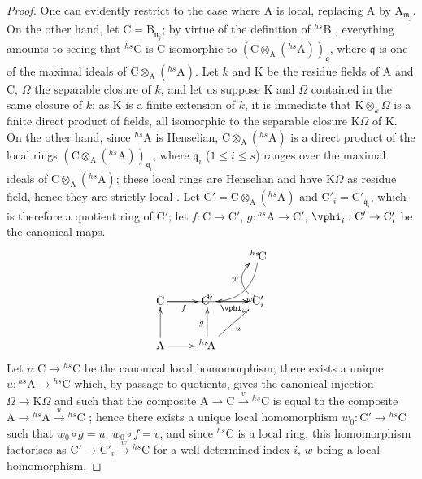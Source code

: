 \begin{proof}
One can evidently restrict to the case where A is local, replacing A by $\mathrm{A}_{\mathfrak{m}_j}$.
On the other hand, let $\mathrm{C}=\mathrm{B}_{\mathfrak{n}_j}$;
by virtue of the definition of ${}^{hs}\!\mathrm{B}$ , everything amounts to seeing that ${}^{hs}\!\mathrm{C}$ is C-isomorphic to $(\mathrm{C}\otimes_{\mathrm{A}}({}^{hs}\!\mathrm{A}))_{\mathfrak{q}}$, where $\mathfrak{q}$ is one of the maximal ideals of $\mathrm{C}\otimes_{\mathrm{A}}({}^{hs}\!\mathrm{A})$.
Let $k$ and K be the residue fields of A and C, $\Omega$ the separable closure of $k$, and let us suppose K and $\Omega$ contained in the same closure of $k$;
as K is a finite extension of $k$, it is immediate that $\mathrm{K}\otimes_k\Omega$ is a finite direct product of fields, all isomorphic to the separable closure $\mathrm{K}\Omega$ of K.
On the other hand, since ${}^{hs}\!\mathrm{A}$ is Henselian, $\mathrm{C}\otimes_{\mathrm{A}}({}^{hs}\!\mathrm{A})$ is a direct product of the local rings $(\mathrm{C}\otimes_{\mathrm{A}}({}^{hs}\!\mathrm{A}))_{\mathfrak{q}_i}$, where $\mathfrak{q}_i$ ($1\leq i\leq s$) ranges over the maximal ideals of $\mathrm{C}\otimes_{\mathrm{A}}({}^{hs}\!\mathrm{A})$; these local rings are Henselian  and have $\mathrm{K}\Omega$ as residue field, hence they are strictly local .
Let $\mathrm{C}'=\mathrm{C}\otimes_{\mathrm{A}}({}^{hs}\!\mathrm{A})$ and $\mathrm{C}'_i=\mathrm{C}'_{\mathfrak{q}_i}$, which is therefore a quotient ring of $\mathrm{C}'$;
let $f:\mathrm{C}\to\mathrm{C}'$, $g:{}^{hs}\!\mathrm{A}\to\mathrm{C}'$, $\vphi_i:\mathrm{C}'\to\mathrm{C}'_i$ be the canonical maps.
\[
  \xymatrix{
    && {}^{hs}\!\mathrm{C} \ar@/^1.2pc/[dl]^{w'} \\
    \mathrm{C} \ar[rr]^{v} \ar[r]_{f} & \mathrm{C}' \ar[r]_{\vphi_i} & \mathrm{C}'_i \ar@/^1.2pc/[u]^{w} \\
    \mathrm{A} \ar[u] \ar[r] & {}^{hs}\!\mathrm{A} \ar[u]^{g} \ar[ur]_{u}
  }
\]
Let $v:\mathrm{C}\to{}^{hs}\!\mathrm{C}$ be the canonical local homomorphism;
there exists a unique $u:{}^{hs}\!\mathrm{A}\to{}^{hs}\!\mathrm{C}$ which, by passage to quotients, gives the canonical injection $\Omega\to\mathrm{K}\Omega$ and such that the composite $\mathrm{A}\to\mathrm{C}\xrightarrow{v}{}^{hs}\!\mathrm{C}$ is equal to the composite $\mathrm{A}\to{}^{hs}\!\mathrm{A}\xrightarrow{u}{}^{hs}\!\mathrm{C}$ ;
hence there exists a unique local homomorphism $w_0:\mathrm{C}'\to{}^{hs}\!\mathrm{C}$ such that $w_0\circ g=u$, $w_0\circ f=v$, and since ${}^{hs}\!\mathrm{C}$ is a local ring, this homomorphism factorises as $\mathrm{C}'\to\mathrm{C}'_i\xrightarrow{w}{}^{hs}\!\mathrm{C}$ for a well-determined index $i$, $w$ being a local homomorphism.

\end{proof}
